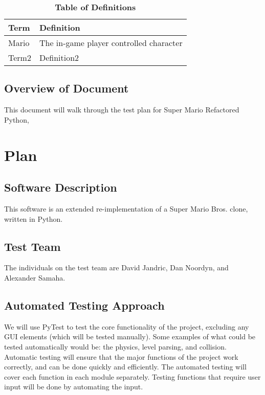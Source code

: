 \documentclass[12pt, titlepage]{article}
\begin{document}
\begin{table}[!htbp]
\caption{\textbf{Table of Definitions}} \label{Table}
\begin{tabularx}{\textwidth}{p{3cm}X}
\toprule
\textbf{Term} & \textbf{Definition}\\
\midrule
Mario & The in-game player controlled character\\
Term2 & Definition2\\
\bottomrule
\end{tabularx}
\end{table}



\subsection{Overview of Document}
This document will walk through the test plan for Super Mario Refactored Python,



\section{Plan}

\subsection{Software Description}
This software is an extended re-implementation of a Super Mario Bros. clone,
written in Python.


\subsection{Test Team}
The individuals on the test team are David Jandric, Dan Noordyn, and Alexander Samaha.



\subsection{Automated Testing Approach}
We will use PyTest to test the core functionality of the project, excluding any
GUI elements (which will be tested manually). Some examples of what could be
tested automatically would be: the physics, level parsing, and collision.
Automatic testing will ensure that the major functions of the project work
correctly, and can be done quickly and efficiently. The automated testing
will cover each function in each module separately. Testing functions that require
user input will be done by automating the input.
\end{document}
